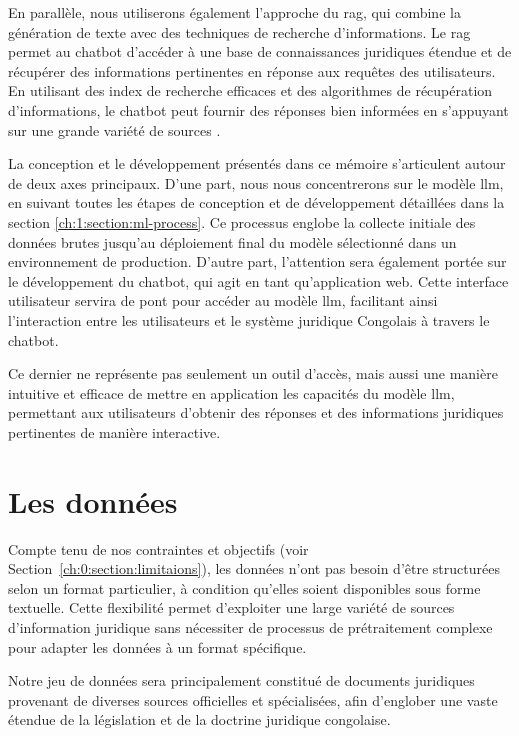 En parallèle, nous utiliserons également l'approche du \ac{rag}, qui combine la génération de texte avec des techniques de recherche d'informations. Le \ac{rag} permet au chatbot d'accéder à une base de connaissances juridiques étendue et de récupérer des informations pertinentes en réponse aux requêtes des utilisateurs. En utilisant des index de recherche efficaces et des algorithmes de récupération d'informations, le chatbot peut fournir des réponses bien informées en s'appuyant sur une grande variété de sources \cite{lewis2021retrievalaugmented}.

La conception et le développement présentés dans ce mémoire s'articulent autour de deux axes principaux. D'une part, nous nous concentrerons sur le modèle \ac{llm}, en suivant toutes les étapes de conception et de développement détaillées dans la section \ref{ch:1:section:ml-process}. Ce processus englobe la collecte initiale des données brutes jusqu'au déploiement final du modèle sélectionné dans un environnement de production. D'autre part, l'attention sera également portée sur le développement du chatbot, qui agit en tant qu'application web. Cette interface utilisateur servira de pont pour accéder au modèle \ac{llm}, facilitant ainsi l'interaction entre les utilisateurs et le système juridique Congolais à travers le chatbot. 

Ce dernier ne représente pas seulement un outil d'accès, mais aussi une manière intuitive et efficace de mettre en application les capacités du modèle \ac{llm}, permettant aux utilisateurs d'obtenir des réponses et des informations juridiques pertinentes de manière interactive.

\section{Les données}

Compte tenu de nos contraintes et objectifs (voir Section~\ref{ch:0:section:limitaions}), les données n'ont pas besoin d'être structurées selon un format particulier, à condition qu'elles soient disponibles sous forme textuelle. Cette flexibilité permet d'exploiter une large variété de sources d'information juridique sans nécessiter de processus de prétraitement complexe pour adapter les données à un format spécifique.

Notre jeu de données sera principalement constitué de documents juridiques provenant de diverses sources officielles et spécialisées, afin d'englober une vaste étendue de la législation et de la doctrine juridique congolaise.

